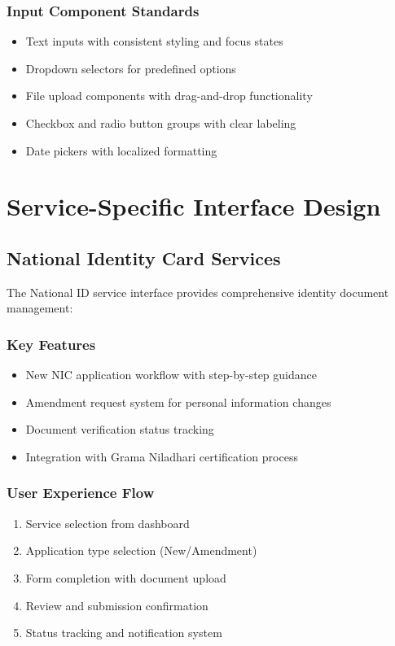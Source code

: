 \documentclass[12pt,a4paper]{article}
\begin{document}
\subsubsection{Input Component Standards}

\begin{itemize}
    \item Text inputs with consistent styling and focus states
    \item Dropdown selectors for predefined options
    \item File upload components with drag-and-drop functionality
    \item Checkbox and radio button groups with clear labeling
    \item Date pickers with localized formatting
\end{itemize}

\section{Service-Specific Interface Design}

\subsection{National Identity Card Services}

The National ID service interface provides comprehensive identity document management:

\subsubsection{Key Features}
\begin{itemize}
    \item New NIC application workflow with step-by-step guidance
    \item Amendment request system for personal information changes
    \item Document verification status tracking
    \item Integration with Grama Niladhari certification process
\end{itemize}

\subsubsection{User Experience Flow}
\begin{enumerate}
    \item Service selection from dashboard
    \item Application type selection (New/Amendment)
    \item Form completion with document upload
    \item Review and submission confirmation
    \item Status tracking and notification system
\end{enumerate}
\end{document}
